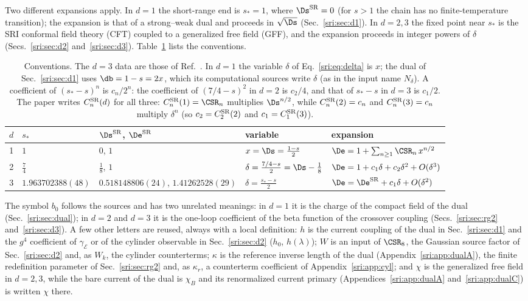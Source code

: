 Two different expansions apply. In $d=1$ the short-range end is $s_*=1$, where $\Ds^{\rm SR}=0$ (for $s>1$ the chain
has no finite-temperature transition); the expansion is that of a strong--weak dual and proceeds in $\sqrt{\Ds}$
(Sec.~\ref{sri:sec:d1}). In $d=2,3$ the fixed point near $s_*$ is the SRI conformal field theory (CFT) coupled to a
generalized free field (GFF), and the expansion proceeds in integer powers of $\delta$
(Secs.~\ref{sri:sec:d2} and~\ref{sri:sec:d3}). Table~\ref{sri:tab:conv} lists the conventions.

\begin{table}[htbp]\centering\small
\renewcommand{\arraystretch}{1.25}\setlength{\tabcolsep}{4pt}
\begin{tabular}{@{}cllll@{}}
\toprule
$d$ & $s_*$ & $\Ds^{\rm SR}$, $\De^{\rm SR}$ & variable & expansion\\
\midrule
1 & $1$ & $0$, $1$ & $x=\Ds=\frac{1-s}{2}$ & $\De=1+\sum_{n\ge1}\CSR_n\,x^{n/2}$\\
2 & $\frac74$ & $\frac18$, $1$ & $\delta=\frac{7/4-s}{2}=\Ds-\frac18$ & $\De=1+c_1\delta+c_2\delta^2+O(\delta^3)$\\
3 & $1.963702388(48)$ & $0.518148806(24)$, $1.41262528(29)$ & $\delta=\frac{s_*-s}{2}$ & $\De=\De^{\rm SR}+c_1\delta+O(\delta^2)$\\
\bottomrule
\end{tabular}
\caption{Conventions. The $d=3$ data are those of Ref.~\cite{sri:Chang:2024whx}. In $d=1$ the variable $\delta$ of
Eq.~\eqref{sri:eq:delta} is $x$; the dual of Sec.~\ref{sri:sec:d1} uses $\db=1-s=2x$, which its computational sources write
$\delta$ (as in the input name $N_\delta$). A coefficient of $(s_*-s)^n$ is $c_n/2^n$: the coefficient of $(7/4-s)^2$ in
$d=2$ is $c_2/4$, and that of $s_*-s$ in $d=3$ is $c_1/2$. The paper writes $C^{\rm SR}_n(d)$ for all three:
$C^{\rm SR}_n(1)=\CSR_n$ multiplies $\Ds^{n/2}$, while $C^{\rm SR}_n(2)=c_n$ and $C^{\rm SR}_n(3)=c_n$ multiply
$\delta^n$ (so $c_2=C^{\rm SR}_2(2)$ and $c_1=C^{\rm SR}_1(3)$).}
\label{sri:tab:conv}
\end{table}

The symbol $b_0$ follows the sources and has two unrelated meanings: in $d=1$ it is the charge of the compact field of
the dual (Sec.~\ref{sri:sec:dual}); in $d=2$ and $d=3$ it is the one-loop coefficient of the beta function of the
crossover coupling (Secs.~\ref{sri:sec:rg2} and~\ref{sri:sec:d3}). A few other letters are reused, always with a local
definition: $h$ is the current coupling of the dual in Sec.~\ref{sri:sec:d1} and the $g^4$ coefficient of
$\gamma_{\mathcal E}$ or of the cylinder observable in Sec.~\ref{sri:sec:d2} ($h_0$, $h(\lambda)$); $W$ is an input of
$\CSR_8$, the Gaussian source factor of Sec.~\ref{sri:sec:d2} and, as $W_k$, the cylinder counterterms; $\kappa$ is the
reference inverse length of the dual (Appendix~\ref{sri:app:dualA}), the finite redefinition parameter of
Sec.~\ref{sri:sec:rg2} and, as $\kappa_r$, a counterterm coefficient of Appendix~\ref{sri:app:cyl}; and $\chi$ is the
generalized free field in $d=2,3$, while the bare current of the dual is $\chi_B$ and its renormalized current primary
(Appendices~\ref{sri:app:dualA} and~\ref{sri:app:dualC}) is written $\chi$ there.

